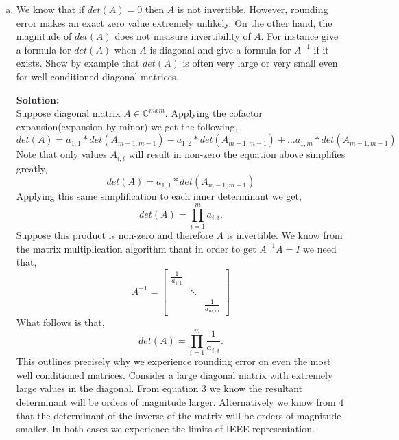 \documentclass[12pt]{article}
\makeatletter
\theoremstyle{homework}
\newenvironment{exercise}[1]
{\def\@currentlabel{#1}\exercisecore}
{\endexercisecore}
\newcommand{\localhead}[1]{\par\smallskip\noindent\textbf{#1}\nobreak\\}%
\newcommand\solution{\localhead{Solution:}}
\newcommand{\Cplx}{\ensuremath{\mathbb C}}
\let\CC\Cplx
\makeatother
\begin{document}
\begin{exercise}{P6}
\begin{enumerate}[a.]
          \item We know that if $det(A)  = 0$ then $A$ is not invertible. However, rounding error makes an exact
          zero value extremely unlikely. On the other hand, the magnitude of $det(A)$ does not measure invertibility of $A$.
          For instance give a formula for $det(A)$ when $A$ is diagonal and give a formula for $A^{-1}$ if it exists. Show by example that
          $det(A)$ is often very large or very small even for well-conditioned diagonal matrices. \\
          \solution Suppose diagonal matrix $A \in \CC^{mxm}$. Applying the cofactor expansion(expansion by minor) we get the following, 
          \begin{equation*}
            det(A) = a_{1,1}*det(A_{m-1,m-1}) - a_{1,2}*det(A_{m-1,m-1}) + \dots a_{1,m}*det(A_{m-1,m-1})
          \end{equation*}
          Note that only values $A_{i,i}$ will result in non-zero the equation above simplifies greatly, 
          \begin{equation*}
            det(A) = a_{1,1}*det(A_{m-1,m-1})
          \end{equation*}
          Applying this same simplification to each inner determinant we get, 
          \begin{equation}
            det(A) = \prod_{i = 1}^m a_{i,i}.
          \end{equation}
          Suppose this product is non-zero and therefore $A$ is invertible. We know from the matrix multiplication algorithm thant in order to get $A^{-1}A = I$ we need that, 
          \begin{equation*}
            A^{-1} =  \begin{bmatrix}
              \frac{1}{a_{1,1}} & & \\
              & \ddots & \\
              & & \frac{1}{a_{m,m}}
            \end{bmatrix}
          \end{equation*}
          What follows is that, 
          \begin{equation*}
            det(A) = \prod_{i = 1}^m \frac{1}{a_{i,i}}.
          \end{equation*}
          This outlines precisely why we experience rounding error on even the most well conditioned matrices. 
          Consider a large diagonal matrix with extremely large values in the diagonal. From equation 3 we know the resultant determinant 
          will be orders of magnitude larger. Alternatively we know from $4$ that the determinant of the inverse of the matrix 
          will be orders of magnitude smaller. In both cases we experience the limits of IEEE representation. 
  \end{enumerate}
\end{exercise}
\vspace{.5in}
\end{document}

